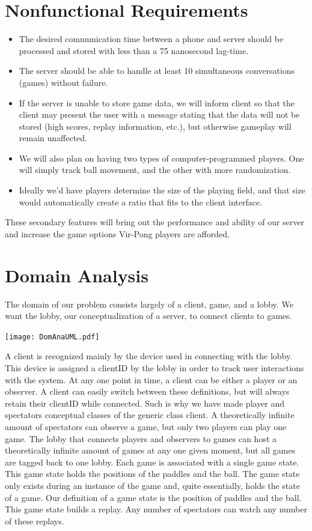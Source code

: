 \documentclass[letterpaper,12pt]{article}
\begin{document}
\section{Nonfunctional Requirements}
\begin{itemize}
\item The desired communication time between a phone and server should be processed and stored with less than a 75 nanosecond lag-time.
\item The server should be able to handle at least 10 simultaneous conversations (games) without failure. 
\item If the server is unable to store game data, we will inform client so that the client may present the user with a message stating that the data will not be stored (high scores, replay information, etc.), but otherwise gameplay will remain unaffected. 
\item We will also plan on having two types of computer-programmed players. One will simply track ball movement, and the other with more randomization. 
\item Ideally we'd have players determine the size of the playing field, and that size would automatically create a ratio that fits to the client interface. 
\end{itemize}
These secondary features will bring out the performance and ability of our server and increase the game options Vir-Pong players are afforded. 

\section{Domain Analysis}
The domain of our problem consists largely of a client, game, and a lobby. We want the lobby, our conceptualization of a server, to connect clients to games.\\
\begin{center}\texttt{[image: DomAnaUML.pdf]} \end{center} 
A client is recognized mainly by the device used in connecting with the lobby. This device is assigned a clientID by the lobby in order to track user interactions with the system. At any one point in time, a client can be either a player or an observer. A client can easily switch between these definitions, but will always retain their clientID while connected. Such is why we have made player and spectators conceptual classes of the generic class client. A theoretically infinite amount of spectators can observe a game, but only two players can play one game. The lobby that connects players and observers to games can host a theoretically infinite amount of games at any one given moment, but all games are tagged back to one lobby. Each game is associated with a single game state. This game state holds the positions of the paddles and the ball. The game state only exists during an instance of the game and, quite essentially, holds the state of a game. Our definition of a game state is the position of paddles and the ball. This game state builds a replay. Any number of spectators can watch any number of these replays. 
\end{document}
